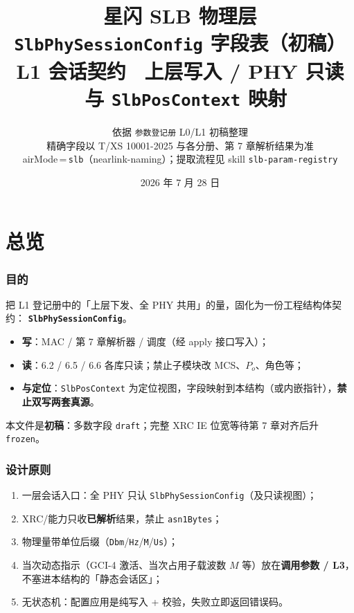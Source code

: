\documentclass[11pt,a4paper]{ctexart}
\title{%
  \textbf{星闪 SLB 物理层}\\[0.35em]
  \Large \texttt{SlbPhySessionConfig} 字段表（初稿）\\[0.25em]
  \large L1 会话契约 \textbullet\ 上层写入 / PHY 只读 \textbullet\ 与 \texttt{SlbPosContext} 映射
}
\author{依据 \texttt{参数登记册} L0/L1 初稿整理\\
精确字段以 T/XS 10001-2025 与各分册、第 7 章解析结果为准\\[0.25em]
\small airMode\,=\,\texttt{slb}（nearlink-naming）；提取流程见 skill \texttt{slb-param-registry}
}
\date{2026 年 7 月 28 日}
\begin{document}
\maketitle
\tableofcontents
\newpage

\part{总览}

\section{目的}

把 L1 登记册中的「上层下发、全 PHY 共用」的量，固化为一份工程结构体契约：
\textbf{\texttt{SlbPhySessionConfig}}。

\begin{itemize}[nosep]
  \item \textbf{写}：MAC / 第 7 章解析器 / 调度（经 apply 接口写入）；
  \item \textbf{读}：6.2 / 6.5 / 6.6 各库只读；禁止子模块改 MCS、$P_o$、角色等；
  \item \textbf{与定位}：\texttt{SlbPosContext} 为定位视图，字段映射到本结构（或内嵌指针），\textbf{禁止双写两套真源}。
\end{itemize}

本文件是\textbf{初稿}：多数字段 \texttt{draft}；完整 XRC IE 位宽等待第 7 章对齐后升 \texttt{frozen}。

\section{设计原则}

\begin{enumerate}[nosep]
  \item 一层会话入口：全 PHY 只认 \texttt{SlbPhySessionConfig}（及只读视图）；
  \item XRC/能力只收\textbf{已解析}结果，禁止 \texttt{asn1Bytes}；
  \item 物理量带单位后缀（\texttt{Dbm}/\texttt{Hz}/\texttt{M}/\texttt{Us}）；
  \item 当次动态指示（GCI-4 激活、当次占用子载波数 $M$ 等）放在\textbf{调用参数 / L3}，不塞进本结构的「静态会话区」；
  \item 无状态机：配置应用是纯写入 + 校验，失败立即返回错误码。
\end{enumerate}
\end{document}
